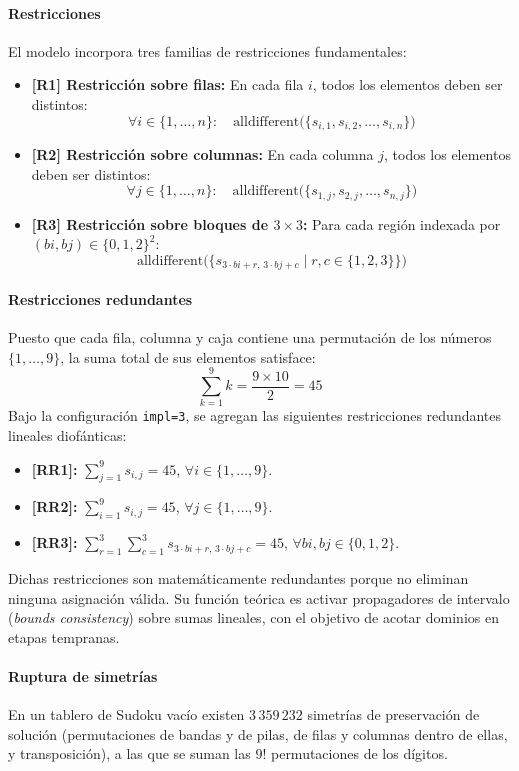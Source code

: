 \paragraph{Restricciones}
El modelo incorpora tres familias de restricciones fundamentales:
\begin{itemize}
    \item \textbf{[R1] Restricción sobre filas:} En cada fila $i$, todos los elementos deben ser distintos:
    \[
    \forall i \in \{1, \dots, n\}: \quad \text{alldifferent}\Big(\{s_{i,1}, s_{i,2}, \dots, s_{i,n}\}\Big)
    \]
    \item \textbf{[R2] Restricción sobre columnas:} En cada columna $j$, todos los elementos deben ser distintos:
    \[
    \forall j \in \{1, \dots, n\}: \quad \text{alldifferent}\Big(\{s_{1,j}, s_{2,j}, \dots, s_{n,j}\}\Big)
    \]
    \item \textbf{[R3] Restricción sobre bloques de $3 \times 3$:} Para cada región indexada por $(bi, bj) \in \{0, 1, 2\}^2$:
    \[
    \text{alldifferent}\Big(\{s_{3 \cdot bi + r, \, 3 \cdot bj + c} \mid r, c \in \{1, 2, 3\}\}\Big)
    \]
\end{itemize}

\paragraph{Restricciones redundantes}
Puesto que cada fila, columna y caja contiene una permutación de los números $\{1, \dots, 9\}$, la suma total de sus elementos satisface:
\[
\sum_{k=1}^9 k = \frac{9 \times 10}{2} = 45
\]
Bajo la configuración \texttt{impl=3}, se agregan las siguientes restricciones redundantes lineales diofánticas:
\begin{itemize}
    \item \textbf{[RR1]:} $\sum_{j=1}^9 s_{i,j} = 45$, $\forall i \in \{1, \dots, 9\}$.
    \item \textbf{[RR2]:} $\sum_{i=1}^9 s_{i,j} = 45$, $\forall j \in \{1, \dots, 9\}$.
    \item \textbf{[RR3]:} $\sum_{r=1}^3 \sum_{c=1}^3 s_{3 \cdot bi + r, \, 3 \cdot bj + c} = 45$, $\forall bi, bj \in \{0, 1, 2\}$.
\end{itemize}
Dichas restricciones son matemáticamente redundantes porque no eliminan ninguna asignación válida. Su función teórica es activar propagadores de intervalo (\textit{bounds consistency}) sobre sumas lineales, con el objetivo de acotar dominios en etapas tempranas.

\paragraph{Ruptura de simetrías}
En un tablero de Sudoku vacío existen $3\,359\,232$ simetrías de preservación de solución (permutaciones de bandas y de pilas, de filas y columnas dentro de ellas, y transposición), a las que se suman las $9!$ permutaciones de los dígitos. 

